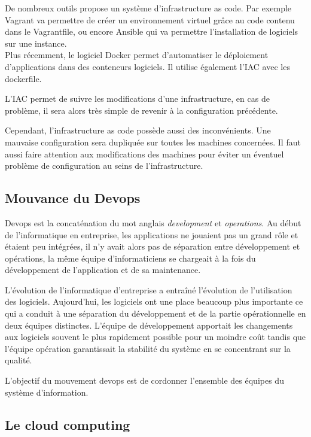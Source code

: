 \documentclass[]{article}
\begin{document}
De nombreux outils propose un système d'infrastructure as code. Par exemple Vagrant va permettre de créer un environnement virtuel grâce au code contenu dans
le Vagrantfile, ou encore Ansible qui va permettre l'installation de logiciels sur une instance. \\
Plus récemment, le logiciel Docker permet
d'automatiser le déploiement d'applications dans des conteneurs
logiciels. Il utilise également l'IAC avec les dockerfile. 

L'IAC permet de suivre les modifications d'une
infrastructure, en cas de problème, il sera alors très simple de revenir
à la configuration précédente. 

Cependant, l'infrastructure as code possède aussi des inconvénients. Une mauvaise configuration sera dupliquée sur toutes les machines concernées.
Il faut aussi faire attention aux modifications des machines pour éviter un éventuel problème de configuration au seins de l'infrastructure.

\subsection{Mouvance du Devops}\label{mouvance-devops}

Devops est la concaténation du mot anglais \emph{development} et
\emph{operations}. Au début de l'informatique en
entreprise, les applications ne jouaient pas un grand rôle et étaient
peu intégrées, il n'y avait alors pas de séparation entre développement
et opérations, la même équipe d'informaticiens se chargeait à la fois du
développement de l'application et de sa maintenance.

L'évolution de l'informatique d'entreprise a entraîné l'évolution de
l'utilisation des logiciels. Aujourd'hui, les logiciels ont une place
beaucoup plus importante ce qui a conduit à une
séparation du développement et de la partie opérationnelle en deux
équipes distinctes. L'équipe de développement apportait les changements
aux logiciels souvent le plus rapidement possible pour un moindre coût
tandis que l'équipe opération garantissait la stabilité du système en se
concentrant sur la qualité. 

L'objectif du mouvement devops est de cordonner l'ensemble des équipes du système d'information.

\subsection{Le cloud computing}\label{le-cloud-computing}
\end{document}
